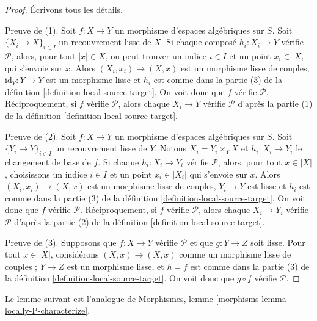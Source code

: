 \begin{proof}
Écrivons tous les détails.

\medskip\noindent
Preuve de (1). Soit $f : X \to Y$ un morphisme d'espaces algébriques sur $S$.
Soit $\{X_i \to X\}_{i \in I}$ un recouvrement lisse de $X$. Si chaque composé
$h_i : X_i \to Y$ vérifie $\mathcal{P}$, alors, pour tout $|x| \in X$, on peut trouver
un indice $i \in I$ et un point $x_i \in |X_i|$ qui s'envoie sur $x$. Alors
$(X_i, x_i) \to (X, x)$ est un morphisme lisse de couples,
$\text{id}_Y : Y \to Y$ est un morphisme lisse et $h_i$ est comme dans la partie (3) de la
définition \ref{definition-local-source-target}.
On voit donc que $f$ vérifie $\mathcal{P}$.
Réciproquement, si $f$ vérifie $\mathcal{P}$, alors chaque $X_i \to Y$ vérifie
$\mathcal{P}$ d'après la
partie (1) de la définition \ref{definition-local-source-target}.

\medskip\noindent
Preuve de (2). Soit $f : X \to Y$ un morphisme d'espaces algébriques sur $S$.
Soit $\{Y_i \to Y\}_{i \in I}$ un recouvrement lisse de $Y$.
Notons $X_i = Y_i \times_Y X$ et $h_i : X_i \to Y_i$ le changement de base
de $f$. Si chaque $h_i : X_i \to Y_i$ vérifie $\mathcal{P}$, alors, pour tout
$x \in |X|$, choisissons un indice $i \in I$ et un point $x_i \in |X_i|$ qui s'envoie sur $x$.
Alors $(X_i, x_i) \to (X, x)$ est un morphisme lisse de couples, $Y_i \to Y$ est
lisse et $h_i$ est comme dans la partie (3) de la
définition \ref{definition-local-source-target}.
On voit donc que $f$ vérifie $\mathcal{P}$.
Réciproquement, si $f$ vérifie $\mathcal{P}$, alors chaque $X_i \to Y_i$ vérifie
$\mathcal{P}$ d'après la
partie (2) de la définition \ref{definition-local-source-target}.

\medskip\noindent
Preuve de (3). Supposons que $f : X \to Y$ vérifie $\mathcal{P}$ et que $g : Y \to Z$ soit
lisse. Pour tout $x \in |X|$, considérons $(X, x) \to (X, x)$ comme un
morphisme lisse de couples ; $Y \to Z$ est un morphisme lisse, et $h = f$ est comme
dans la partie (3) de la
définition \ref{definition-local-source-target}.
On voit donc que $g \circ f$ vérifie $\mathcal{P}$.
\end{proof}

\noindent
Le lemme suivant est l'analogue de
Morphismes, lemme \ref{morphisms-lemma-locally-P-characterize}.

